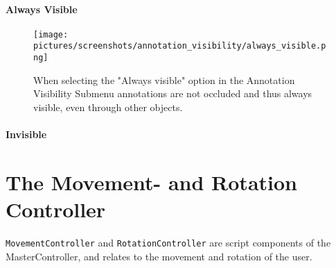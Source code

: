 \paragraph{Always Visible}
\begin{figure}%
	\texttt{[image: pictures/screenshots/annotation\_visibility/always\_visible.png]}
	\caption[Annotation always visible]{When selecting the "Always visible" option in the Annotation Visibility Submenu annotations are not occluded and thus always visible, 
	even through other objects.}
	\label{fig:always_visible}
\end{figure} 

\paragraph{Invisible}

\section{The Movement- and Rotation Controller}
\texttt{MovementController} and \texttt{RotationController} are script components of the MasterController, and relates to the movement and rotation of the user.












